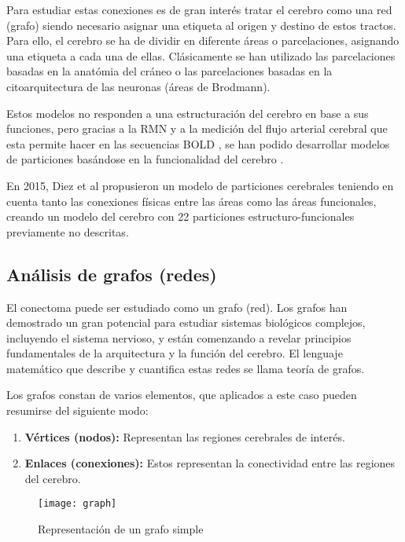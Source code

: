\documentclass[fleqn,10pt]{UICArticle} %
\begin{document}
Para estudiar estas conexiones es de gran interés tratar el cerebro como una red (grafo) siendo necesario asignar una etiqueta al origen y destino de estos tractos. Para ello, el cerebro se ha de dividir en diferente áreas o parcelaciones, asignando una etiqueta a cada una de ellas. Clásicamente se han utilizado las parcelaciones basadas en la anatómia del cráneo o las parcelaciones basadas en la citoarquitectura de las neuronas (áreas de Brodmann).

Estos modelos no responden a una estructuración del cerebro en base a sus funciones, pero gracias a la RMN y a la medición del flujo arterial cerebral que esta permite hacer en las secuencias BOLD \cite{Ogawa1990}, se han podido desarrollar modelos de particiones basándose en la funcionalidad del cerebro \cite{Heller2006}.

En 2015, Diez et al \cite{Diez2015} propusieron un modelo de particiones cerebrales teniendo en cuenta tanto las conexiones físicas entre las áreas como las áreas funcionales, creando un modelo del cerebro con 22 particiones estructuro-funcionales previamente no descritas. %


\subsection{Análisis de grafos (redes)}

 El conectoma puede ser estudiado como un grafo (red)\cite{Fornito}. Los grafos han demostrado un gran potencial para estudiar sistemas biológicos complejos, incluyendo el sistema nervioso, y están comenzando a revelar principios fundamentales de la arquitectura y la función del cerebro. El lenguaje matemático que describe y cuantifica estas redes se llama teoría de grafos.
 
Los grafos constan de varios elementos, que aplicados a este caso pueden resumirse del siguiente modo:
\begin{enumerate}[noitemsep]
\item \textbf{Vértices (nodos):} Representan las regiones cerebrales de interés.
\item \textbf{Enlaces (conexiones):} Estos representan la conectividad entre las regiones del cerebro.
\end{enumerate}

\begin{figure}[ht]
	\centering
	\texttt{[image: graph]}
	\vspace{5mm} 
	\caption{Representación de un grafo simple}
	\label{fig:graph}
\end{figure}
\end{document}
